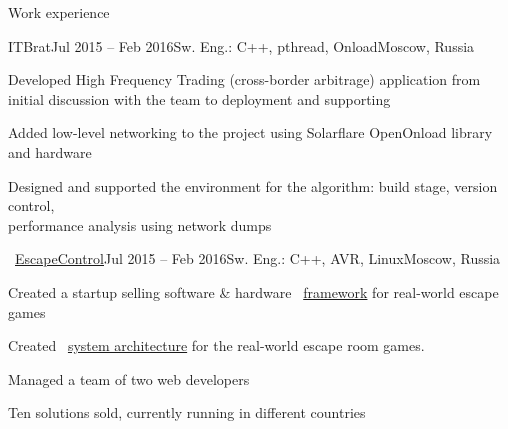 \documentclass{resume} %
\begin{document}
\begin{rSection}{Work experience}
\begin{rSubsection}{ITBrat}{Jul 2015 -- Feb 2016}{Sw. Eng.: C++, pthread, Onload}{Moscow, Russia}
	\item Developed High Frequency Trading (cross-border arbitrage) application from initial discussion with the team to deployment and supporting
	\item Added low-level networking to the project using Solarflare OpenOnload library and hardware
	\item Designed and supported the environment for the algorithm: build stage, version control,\\ performance analysis using network dumps
\end{rSubsection}
	
\begin{rSubsection}{\faExternalLink~\href{http://escapecontrol.ru/index_en.html}{EscapeControl}}{Jul 2015 -- Feb 2016}{Sw. Eng.: C++, AVR, Linux}{Moscow, Russia}
	\item Created a startup selling software \& hardware \faExternalLink~\href{http://demo:demo@ec3.pagekite.escapecontrol.ru}{framework} for real-world escape games
	\item Created \faExternalLink~\href{http://habr.ru/p/258585/}{system architecture} for the real-world escape room games.
	\item Managed a team of two web developers
	\item Ten solutions sold, currently running in different countries
\end{rSubsection}
		
\end{rSection}
\end{document}
